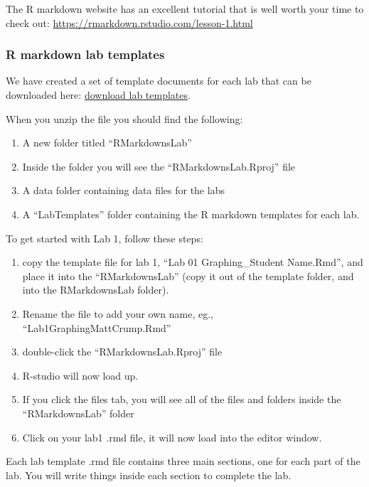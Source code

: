 \documentclass[
]{book}
\providecommand{\tightlist}{%
  \setlength{\itemsep}{0pt}\setlength{\parskip}{0pt}}
\begin{document}
The R markdown website has an excellent tutorial that is well worth your time to check out: \url{https://rmarkdown.rstudio.com/lesson-1.html}

\hypertarget{r-markdown-lab-templates}{%
\subsubsection{R markdown lab templates}\label{r-markdown-lab-templates}}

We have created a set of template documents for each lab that can be downloaded here: \href{https://github.com/CrumpLab/statisticsLab/raw/master/RMarkdownsLab.zip}{download lab templates}.

When you unzip the file you should find the following:

\begin{enumerate}
\def\labelenumi{\arabic{enumi}.}
\tightlist
\item
  A new folder titled ``RMarkdownsLab''
\item
  Inside the folder you will see the ``RMarkdownsLab.Rproj'' file
\item
  A data folder containing data files for the labs
\item
  A ``LabTemplates'' folder containing the R markdown templates for each lab.
\end{enumerate}

To get started with Lab 1, follow these steps:

\begin{enumerate}
\def\labelenumi{\arabic{enumi}.}
\tightlist
\item
  copy the template file for lab 1, ``Lab 01 Graphing\_Student Name.Rmd'', and place it into the ``RMarkdownsLab'' (copy it out of the template folder, and into the RMarkdownsLab folder).
\item
  Rename the file to add your own name, eg., ``Lab1GraphingMattCrump.Rmd''
\item
  double-click the ``RMarkdownsLab.Rproj'' file
\item
  R-studio will now load up.
\item
  If you click the files tab, you will see all of the files and folders inside the ``RMarkdownsLab'' folder
\item
  Click on your lab1 .rmd file, it will now load into the editor window.
\end{enumerate}

Each lab template .rmd file contains three main sections, one for each part of the lab. You will write things inside each section to complete the lab.
\end{document}
